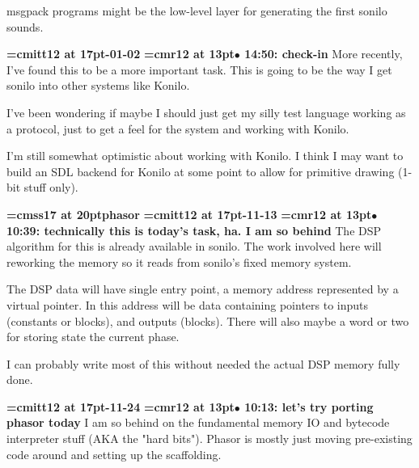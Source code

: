 msgpack programs might be the low-level layer for generating the first sonilo sounds.
\par

{\medskip\noindent\bf\font\titlefont=cmitt12 at 17pt-01-02}\medskip
{\smallskip\noindent\bf\font\titlefont=cmr12 at 13pt\titlefont $\bullet$ 14:50: check-in}\smallskip
More recently, I've found this to be a more important task. This is going to be the way I get sonilo into other systems like Konilo.
\par

I've been wondering if maybe I should just get my silly test language working as a protocol, just to get a feel for the system and working with Konilo.
\par

I'm still somewhat optimistic about working with Konilo. I think I may want to build an SDL backend for Konilo at some point to allow for primitive drawing (1-bit stuff only).
\par

{\medskip\noindent\bf\font\titlefont=cmss17 at 20pt\titlefont phasor}\medskip
{\medskip\noindent\bf\font\titlefont=cmitt12 at 17pt-11-13}\medskip
{\smallskip\noindent\bf\font\titlefont=cmr12 at 13pt\titlefont $\bullet$ 10:39: technically this is today's task, ha. I am so behind}\smallskip
The DSP algorithm for this is already available in sonilo. The work involved here will reworking the memory so it reads from sonilo's fixed memory system.
\par

The DSP data will have single entry point, a memory address represented by a virtual pointer. In this address will be data containing pointers to inputs (constants or blocks), and outputs (blocks). There will also maybe a word or two for storing state the current phase.
\par

I can probably write most of this without needed the actual DSP memory fully done.
\par

{\medskip\noindent\bf\font\titlefont=cmitt12 at 17pt-11-24}\medskip
{\smallskip\noindent\bf\font\titlefont=cmr12 at 13pt\titlefont $\bullet$ 10:13: let's try porting phasor today}\smallskip
I am so behind on the fundamental memory IO and bytecode interpreter stuff (AKA the "hard bits"). Phasor is mostly just moving pre-existing code around and setting up the scaffolding.
\par

